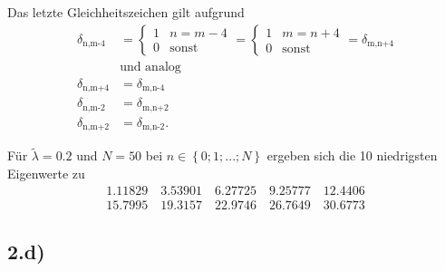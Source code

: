 Das letzte Gleichheitszeichen gilt aufgrund
\begin{align*}
  \delta_\text{n,m-4} &=
  \begin{cases}
    1 & n=m-4 \\
    0 & \text{sonst}
  \end{cases}
  =
  \begin{cases}
    1 & m=n+4 \\
    0 & \text{sonst}
  \end{cases}
  = \delta_\text{m,n+4} \\
  &\text{und analog} \\
  \delta_\text{n,m+4} &= \delta_\text{m,n-4} \\
  \delta_\text{n,m-2} &= \delta_\text{m,n+2} \\
  \delta_\text{n,m+2} &= \delta_\text{m,n-2}
  .
\end{align*}

Für $\tilde{\lambda} = \num{0.2}$ und $N = \num{50}$ bei
$n \in \left\{0;1;...;N\right\}$ ergeben sich die 10 niedrigsten Eigenwerte zu
\begin{gather*}
  \num{1.11829} \quad \num{3.53901} \quad \num{6.27725} \quad \num{9.25777} \quad \num{12.4406} \\
  \num{15.7995} \quad \num{19.3157} \quad \num{22.9746} \quad \num{26.7649} \quad \num{30.6773}
\end{gather*}

\subsection*{2.d)}

